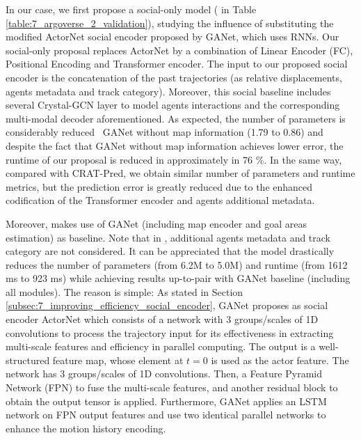 In our case, we first propose a social-only model ( in Table \ref{table:7_argoverse_2_validation}), studying the influence of substituting the modified ActorNet \cite{wang2022ganet, liang2020learning} social encoder proposed by GANet, which uses \acp{RNN}. Our social-only proposal replaces ActorNet by a combination of Linear Encoder (\ac{FC}), Positional Encoding and Transformer encoder. The input to our proposed social encoder is the concatenation of the past trajectories (as relative displacements, agents metadata and track category). Moreover, this social baseline includes several Crystal-\ac{GCN} layer to model agents interactions and the corresponding multi-modal decoder aforementioned. As expected, the number of parameters is considerably reduced \wrt \ GANet without map information (1.79 to 0.86) and despite the fact that GANet without map information achieves lower error, the runtime of our proposal is reduced in approximately in 76 \%. In the same way, compared with CRAT-Pred, we obtain similar number of parameters and runtime metrics, but the prediction error is greatly reduced due to the enhanced codification of the Transformer encoder and agents additional metadata.

Moreover,  makes use of GANet (including map encoder and goal areas estimation) as baseline. Note that in , additional agents metadata and track category are not considered. It can be appreciated that the model drastically reduces the number of parameters (from 6.2M to 5.0M) and runtime (from 1612 ms to 923 ms) while achieving results up-to-pair with GANet baseline (including all modules). The reason is simple: As stated in Section \ref{subsec:7_improving_efficiency_social_encoder}, GANet \cite{wang2022ganet} proposes as social encoder ActorNet which consists of a network with $3$ groups/scales of 1D convolutions to process the trajectory input for its effectiveness in extracting multi-scale features and efficiency in parallel computing. The output is a well-structured feature map, whose element at $t=0$ is used as the actor feature. The network has $3$ groups/scales of 1D convolutions. Then, a Feature Pyramid Network (FPN) to fuse the multi-scale features, and another residual block to obtain the output tensor is applied. Furthermore, GANet applies an \ac{LSTM} network on FPN output features and use two identical parallel networks to enhance the motion history encoding. 

